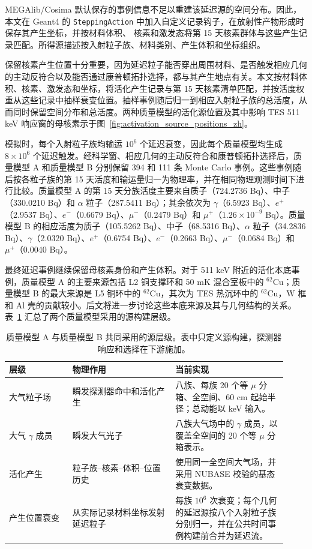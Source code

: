 \documentclass[11pt]{article}
\begin{document}
MEGAlib/Cosima 默认保存的事例信息不足以重建该延迟源的空间分布。因此，本文在 Geant4 的
\texttt{SteppingAction} 中加入自定义记录钩子，在放射性产物形成时保存其产生坐标，并按材料体积、
核素和激发态将第 15 天核素群体与这些产生记录匹配。所得源描述按入射粒子族、材料类别、产生体积和坐标组织。

保留核素产生位置十分重要，因为延迟粒子能否穿出周围材料、是否触发相应几何的主动反符合以及能否通过康普顿拓扑选择，都与其产生地点有关。本文按材料体积、核素、激发态和坐标，将活化产生记录与第 15 天核素清单匹配，并按活度权重从这些记录中抽样衰变位置。抽样事例随后归一到相应入射粒子族的总活度，从而同时保留空间分布和总活度。两种质量模型的活化源位置及其中影响 TES 511 keV 响应窗的母核素示于图~\ref{fig:activation_source_positions_zh}。

模拟时，每个入射粒子族均输运 $10^6$ 个延迟衰变，因此每个质量模型均生成 $8\times10^6$ 个延迟触发。经科学窗、相应几何的主动反符合和康普顿拓扑选择后，质量模型 A 和质量模型 B 分别保留 394 和 111 条 Monte Carlo 事例。这些事例随后按各粒子族的第 15 天活度和输运量归一为物理率，并在相同物理观测时间下进行比较。质量模型 A 的第 15 天分族活度主要来自质子（724.2736 Bq）、中子（330.0210 Bq）和 $\alpha$ 粒子（287.5411 Bq）；其余依次为 $\gamma$（6.5923 Bq）、$e^+$（2.9537 Bq）、$e^-$（0.6679 Bq）、$\mu^-$（0.2479 Bq）和 $\mu^+$（$1.26\times10^{-9}$ Bq）。质量模型 B 的相应活度为质子（105.5262 Bq）、中子（68.5316 Bq）、$\alpha$ 粒子（34.2836 Bq）、$\gamma$（2.0320 Bq）、$e^+$（0.6754 Bq）、$e^-$（0.2663 Bq）、$\mu^-$（0.0684 Bq）和 $\mu^+$（0.0040 Bq）。

最终延迟事例继续保留母核素身份和产生体积。对于 511 keV 附近的活化本底事例，质量模型 A 的主要来源包括 L2 铜支撑环和 50 mK 混合室板中的 $^{62}\mathrm{Cu}$；质量模型 B 的最大来源是 L5 铜环中的 $^{62}\mathrm{Cu}$，其次为 TES 热沉环中的 $^{62}\mathrm{Cu}$，W 框和 Al 壳的贡献较小。后文将进一步讨论这些本底来源及其与几何结构的关系。表~\ref{tab:background_source_model} 汇总了两个质量模型采用的源构建层级。

\begin{table}[H]
\centering
\caption{质量模型 A 与质量模型 B 共同采用的源层级。表中只定义源构建，探测器响应和选择在下游施加。}
\label{tab:background_source_model}
\footnotesize
\begin{tabular}{p{0.21\linewidth}p{0.34\linewidth}p{0.37\linewidth}}
\toprule
层级 & 物理作用 & 当前实现 \\
\midrule
大气粒子场 & 瞬发探测器命中和活化产生 & 八族、每族 20 个等 $\mu$ 分箱、全空间、60 cm 起始半径；总动能以 keV 输入。 \\
大气 $\gamma$ 成员 & 瞬发大气光子 & 八族大气场中的 $\gamma$ 成员，以覆盖全空间的 20 个等 $\mu$ 分箱表示。 \\
活化产生 & 粒子族--核素--体积--位置历史 & 使用同一全空间大气场，并采用 NUBASE 校验的基态衰变数据。 \\
产生位置衰变 & 从实际记录材料坐标发射延迟粒子 & 每族 $10^6$ 次衰变；每个几何的延迟源按八个入射粒子族分别归一，并在公共时间事例构建前合并为延迟流。 \\
\bottomrule
\end{tabular}
\end{table}
\end{document}
